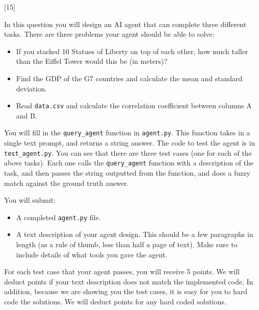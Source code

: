 \graphicspath{ {images/} }

[15]


In this question you will design an AI agent
that can complete three different tasks.
There are three problems your agent should 
be able to solve:

\begin{itemize}
    \item If you stacked 10 Statues of Liberty
    on top of each other, how much taller 
    than the Eiffel Tower would this be (in meters)?
    \item Find the GDP of the G7 countries and calculate the mean and standard deviation.
    \item Read \texttt{data.csv} and calculate the correlation coefficient between columns A and B.
\end{itemize}

You will fill in the \texttt{query\_agent} function 
in \texttt{agent.py}. This function 
takes in a single text prompt, and returns 
a string answer. The code to test the 
agent is in \texttt{test\_agent.py}. You 
can see that there are three test cases 
(one for each of the above tasks). Each 
one calls the \texttt{query\_agent} function 
with a description of the task, and then 
passes the string outputted from the function,
and does a fuzzy match against the ground 
truth answer. 



You will submit:
\begin{itemize}
    \item A completed \texttt{agent.py} 
    file.
    \item A text description of your agent 
    design. This should be a few paragraphs 
    in length (as a rule of thumb, less 
    than half a page of text). Make
    sure to include details of what tools 
    you gave the agent.
\end{itemize}

For each test case that your 
agent passes, you will receive
5 points. We will deduct points if 
your text description does not match 
the implemented code. In addition,
because we are showing you the test
cases, it is easy for you to hard code 
the solutions. We will deduct points 
for any hard coded solutions. 

